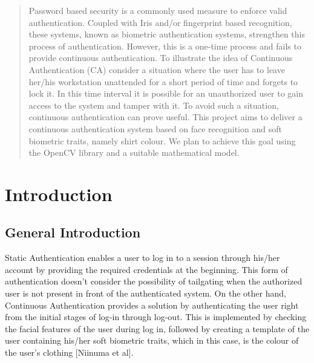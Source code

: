 \documentclass[12pt]{article}			%
\begin{document}
\newpage
\begin{abstract}			%


Password based security is a commonly used measure to enforce valid authentication. Coupled with Iris and/or fingerprint based recognition, these systems, known as biometric authentication systems, strengthen this process of authentication. However, this is a one-time process and fails to provide continuous authentication. To illustrate the idea of Continuous Authentication (CA) consider a situation where the user has to leave her/his workstation unattended for a short period of time and forgets to lock it. In this time interval it is possible for an unauthorized user to gain access to the system and tamper with it. To avoid such a situation, continuous authentication can prove useful. 
This project aims to deliver a continuous authentication system based on face recognition and soft biometric traits, namely shirt colour. We plan to achieve this goal using the OpenCV library and a suitable mathematical model.


\end{abstract}				%

\newpage				%
\tableofcontents			%
\newpage				%

\section{ Introduction }	%


\subsection{ General Introduction }
Static Authentication enables a user to log in to a session through his/her account by providing the required credentials at the beginning. This form of authentication doesn’t consider the possibility of tailgating when the authorized user is not present in front of the authenticated system. On the other hand, Continuous Authentication provides a solution by authenticating the user right from the initial stages of log-in through log-out. This is implemented by checking the facial features of the user during log in, followed by creating a template of the user containing his/her soft biometric traits, which in this case, is the colour of the user’s clothing [Niinuma et al]. 
\end{document}
